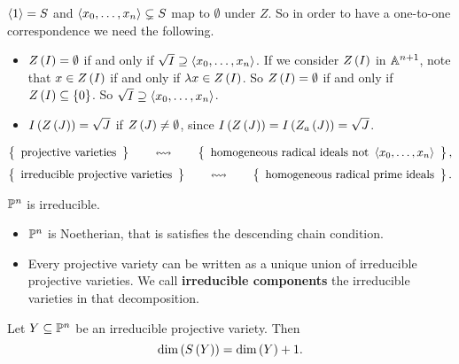 \begin{note*}
$ \ab{1} = S $ and $ \ab{x_0, \dots, x_n} \subsetneq S $ map to $ \emptyset $ under $ Z $. So in order to have a one-to-one correspondence we need the following.
\begin{itemize}
\item $ Z\rb{I} = \emptyset $ if and only if $ \sqrt{I} \supseteq \ab{x_0, \dots, x_n} $. If we consider $ Z\rb{I} $ in $ \A^{n + 1} $, note that $ x \in Z\rb{I} $ if and only if $ \lambda x \in Z\rb{I} $. So $ Z\rb{I} = \emptyset $ if and only if $ Z\rb{I} \subseteq \cb{0} $. So $ \sqrt{I} \supseteq \ab{x_0, \dots, x_n} $.
\item $ I\rb{Z\rb{J}} = \sqrt{J} $ if $ Z\rb{J} \ne \emptyset $, since $ I\rb{Z\rb{J}} = I\rb{Z_a\rb{J}} = \sqrt{J} $.
\end{itemize}
\end{note*}

\pagebreak

\begin{corollary}
$$ \correspondence{\text{projective varieties}}{\text{homogeneous radical ideals not} \ \ab{x_0, \dots, x_n}}, $$
$$ \correspondence{\text{irreducible projective varieties}}{\text{homogeneous radical prime ideals}}. $$
\end{corollary}

\begin{example}
$ \P^n $ is irreducible.
\end{example}

\begin{proposition}
\hfill
\begin{itemize}
\item $ \P^n $ is Noetherian, that is satisfies the descending chain condition.
\item Every projective variety can be written as a unique union of irreducible projective varieties. We call \textbf{irreducible components} the irreducible varieties in that decomposition.
\end{itemize}
\end{proposition}

\begin{theorem}
Let $ Y \subseteq \P^n $ be an irreducible projective variety. Then
$$ \dim\rb{S\rb{Y}} = \dim\rb{Y} + 1. $$
\end{theorem}

